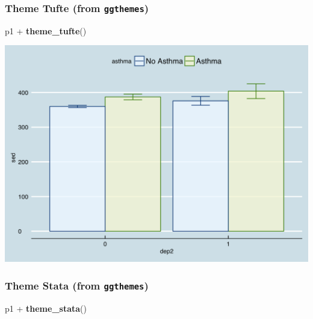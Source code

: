 \documentclass[]{tufte-book}
\newenvironment{Shaded}{}{}
\newcommand{\KeywordTok}[1]{\textcolor[rgb]{0.00,0.44,0.13}{\textbf{#1}}}
\newcommand{\StringTok}[1]{\textcolor[rgb]{0.25,0.44,0.63}{#1}}
\newcommand{\OperatorTok}[1]{\textcolor[rgb]{0.40,0.40,0.40}{#1}}
\newcommand{\NormalTok}[1]{#1}
\theoremstyle{definition}
\theoremstyle{definition}
\theoremstyle{remark}
\begin{document}
\subsubsection*{\texorpdfstring{Theme Tufte (from
\texttt{ggthemes})}{Theme Tufte (from ggthemes)}}\label{theme-tufte-from-ggthemes}

\begin{Shaded}
\begin{Highlighting}[]
\NormalTok{p1 }\OperatorTok{+}\StringTok{ }\KeywordTok{theme_tufte}\NormalTok{()}
\end{Highlighting}
\end{Shaded}

\includegraphics{_main_files/figure-latex/unnamed-chunk-150-1}

\subsubsection*{\texorpdfstring{Theme Stata (from
\texttt{ggthemes})}{Theme Stata (from ggthemes)}}\label{theme-stata-from-ggthemes}

\begin{Shaded}
\begin{Highlighting}[]
\NormalTok{p1 }\OperatorTok{+}\StringTok{ }\KeywordTok{theme_stata}\NormalTok{()}
\end{Highlighting}
\end{Shaded}
\end{document}
